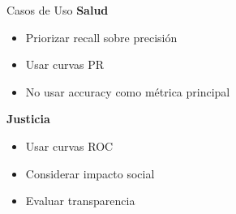 \documentclass{beamer}
\begin{document}
\begin{frame}{Casos de Uso}
    \textbf{Salud}
    \begin{itemize}
        \item Priorizar recall sobre precisión
        \item Usar curvas PR
        \item No usar accuracy como métrica principal
    \end{itemize}
    
    \vspace{0.5em}
    
    \textbf{Justicia}
    \begin{itemize}
        \item Usar curvas ROC
        \item Considerar impacto social
        \item Evaluar transparencia
    \end{itemize}
\end{frame}
\end{document}
